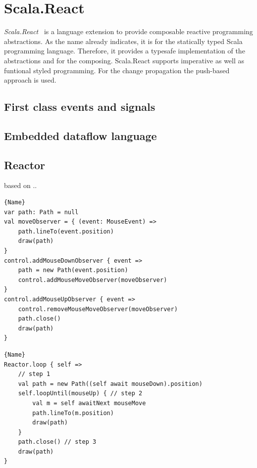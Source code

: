 \documentclass[acmsmall]{acmart}\settopmatter{printfolios=true,printccs=false,printacmref=false}
\begin{document}
\section{Scala.React}
	\textit{Scala.React}~\cite{Maier:2012} is a language extension to provide composable reactive programming abstractions.
	As the name already indicates, it is for the statically typed Scala programming language. 
	Therefore, it provides a typesafe implementation of the abstractions and for the composing. 
	Scala.React supports imperative as well as funtional styled programming.
	For the change propagation the push-based approach is used.
	
	\subsection{First class events and signals}

	\subsection{Embedded dataflow language}

	\subsection{Reactor}
	based on ..\cite{coplien1995reactor}

	\noindent\begin{minipage}{.48\textwidth}
		\begin{lstlisting}[style=myScalastyle,caption={Observer pattern},frame=none]{Name}
var path: Path = null
val moveObserver = { (event: MouseEvent) =>
	path.lineTo(event.position)
	draw(path)
}
control.addMouseDownObserver { event =>
	path = new Path(event.position)
	control.addMouseMoveObserver(moveObserver)
}
control.addMouseUpObserver { event =>
	control.removeMouseMoveObserver(moveObserver)
	path.close()
	draw(path)
}
		\end{lstlisting}
		\end{minipage}\hfill
		\begin{minipage}{.48\textwidth}
		\begin{lstlisting}[style=myScalastyle,caption={Scala.React},frame=none]{Name}
Reactor.loop { self =>
	// step 1
	val path = new Path((self await mouseDown).position)
	self.loopUntil(mouseUp) { // step 2
		val m = self awaitNext mouseMove
		path.lineTo(m.position)
		draw(path)
	}
	path.close() // step 3
	draw(path)
}
		\end{lstlisting}
		\end{minipage}
\end{document}

